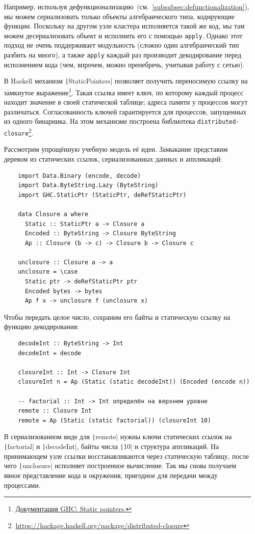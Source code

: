 Например, используя дефункционализацию~(см.~\ref{subsubsec:defunctionalization}), мы можем сериализовать только объекты алгебраического типа, кодирующие функции.
Поскольку на другом узле кластера исполняется такой же код, мы там можем десериализовать объект и исполнить его с помощью \texttt{apply}.
Однако этот подход не очень поддерживает модульность (сложно один алгебраический тип разбить на много), а также \texttt{apply} каждый раз производит декодирование перед исполнением кода (чем, впрочем, можно пренебречь, учитывая работу с сетью).

В Haskell механизм \texttt|StaticPointers| позволяет получить переносимую ссылку на замкнутое выражение\footnote{\href{https://ghc.gitlab.haskell.org/ghc/doc/users_guide/exts/static_pointers.html}{Документация GHC: Static pointers.}}.
Такая ссылка имеет ключ, по которому каждый процесс находит значение в своей статической таблице; адреса памяти у процессов могут различаться.
Согласованность ключей гарантируется для процессов, запущенных из одного бинарника.
На этом механизме построена библиотека \texttt{distributed-closure}\footnote{\url{https://hackage.haskell.org/package/distributed-closure}}.

Рассмотрим упрощённую учебную модель её идеи.
Замыкание представим деревом из статических ссылок, сериализованных данных и аппликаций:
\begin{verbatim}
    import Data.Binary (encode, decode)
    import Data.ByteString.Lazy (ByteString)
    import GHC.StaticPtr (StaticPtr, deRefStaticPtr)

    data Closure a where
      Static :: StaticPtr a -> Closure a
      Encoded :: ByteString -> Closure ByteString
      Ap :: Closure (b -> c) -> Closure b -> Closure c

    unclosure :: Closure a -> a
    unclosure = \case
      Static ptr -> deRefStaticPtr ptr
      Encoded bytes -> bytes
      Ap f x -> unclosure f (unclosure x)
\end{verbatim}

Чтобы передать целое число, сохраним его байты и статическую ссылку на функцию декодирования:
\begin{verbatim}
    decodeInt :: ByteString -> Int
    decodeInt = decode

    closureInt :: Int -> Closure Int
    closureInt n = Ap (Static (static decodeInt)) (Encoded (encode n))

    -- factorial :: Int -> Int определён на верхнем уровне
    remote :: Closure Int
    remote = Ap (Static (static factorial)) (closureInt 10)
\end{verbatim}
В сериализованном виде для \texttt|remote| нужны ключи статических ссылок на \texttt|factorial| и \texttt|decodeInt|, байты числа \texttt|10| и структура аппликаций.
На принимающем узле ссылки восстанавливаются через статическую таблицу, после чего \texttt|unclosure| исполняет построенное вычисление.
Так мы снова получаем явное представление кода и окружения, пригодное для передачи между процессами.

